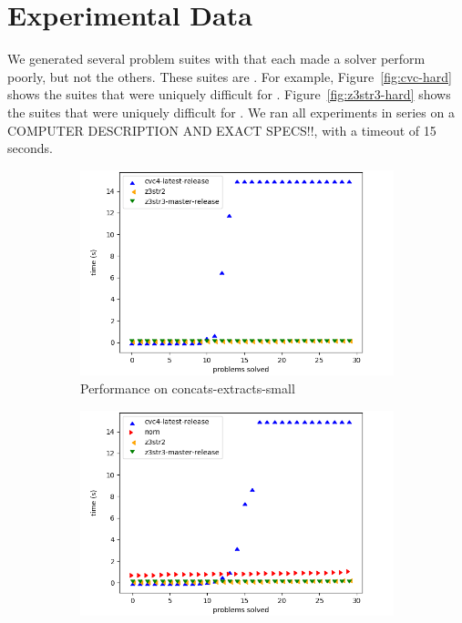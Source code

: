 \section{Experimental Data}
\label{sec:data}
\vspace{-0.1in}

    We generated several problem suites with \fuzzer{} that each made a solver perform poorly, but not the others. 
    These suites are \theSuites{}. For example, Figure~\ref{fig:cvc-hard} shows the suites that were uniquely difficult for \cvc{}. 
    Figure~\ref{fig:z3str3-hard} shows the suites that were uniquely difficult for \us{}. 
    We ran all experiments in series on a COMPUTER DESCRIPTION AND EXACT SPECS!!, with a timeout of 15 seconds.

    \begin{figure}[h]
        \vspace{-0.2in}
        \begin{subfigure}{.5\textwidth}
            \includegraphics[width=\textwidth]{data/graphs/concats-extracts-small.png}                   
            \vspace{-0.25in}
            \caption{Performance on concats-extracts-small} 
            \label{fig:concats-extracts-small}
        \end{subfigure}
        \begin{subfigure}{.5\textwidth}
            \includegraphics[width=\textwidth]{data/graphs/different-prefix.png}            

\end{subfigure}
\end{figure}
